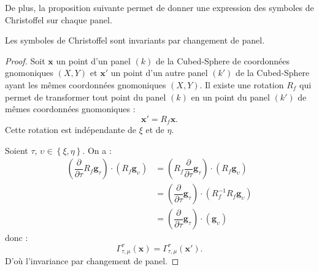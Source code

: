 De plus, la proposition suivante permet de donner une expression des symboles de Christoffel sur chaque panel.

\begin{proposition}
Les symboles de Christoffel sont invariants par changement de panel.
\end{proposition}

\begin{proof}
Soit $\mathbf{x}$ un point d'un panel $(k)$ de la Cubed-Sphere de coordonnées gnomoniques $(X,Y)$ et $\mathbf{x}'$ un point d'un autre panel $(k')$ de la Cubed-Sphere ayant les mêmes coordonnées gnomoniques $(X,Y)$. Il existe une rotation $R_f$ qui permet de transformer tout point du panel $(k)$ en un point du panel $(k')$ de mêmes coordonnées gnomoniques :
\begin{equation}
\mathbf{x}' = R_f \mathbf{x}.
\end{equation}
Cette rotation est indépendante de $\xi$ et de $\eta$.

Soient $\tau$, $\upsilon \in \left\lbrace \xi, \eta \right\rbrace$. On a :
\begin{align*}
\left( \dfrac{\partial}{\partial \tau}  R_f \mathbf{g}_{\tau} \right) \cdot \left( R_f \mathbf{g}_{\upsilon} \right) & = \left( R_f \dfrac{\partial}{\partial \tau}   \mathbf{g}_{\tau} \right) \cdot \left( R_f \mathbf{g}_{\upsilon} \right)\\
	& =  \left( \dfrac{\partial}{\partial \tau}  \mathbf{g}_{\tau} \right) \cdot \left( R_f^{-1} R_f \mathbf{g}_{\upsilon} \right)\\
	& =  \left( \dfrac{\partial}{\partial \tau}  \mathbf{g}_{\tau} \right) \cdot \left( \mathbf{g}_{\upsilon} \right)
\end{align*}
donc :
\begin{equation}
\Gamma_{\tau, \mu}^{\tau}(\mathbf{x})=\Gamma_{\tau, \mu}^{\tau}(\mathbf{x}').
\end{equation}
D'où l'invariance par changement de panel.
\end{proof}

